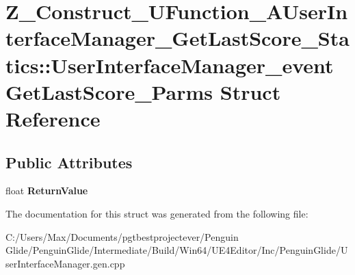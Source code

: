 \hypertarget{struct_z___construct___u_function___a_user_interface_manager___get_last_score___statics_1_1_user926d34881b3e8be3d0bccfb5d9183fea}{}\section{Z\+\_\+\+Construct\+\_\+\+U\+Function\+\_\+\+A\+User\+Interface\+Manager\+\_\+\+Get\+Last\+Score\+\_\+\+Statics\+::User\+Interface\+Manager\+\_\+event\+Get\+Last\+Score\+\_\+\+Parms Struct Reference}
\label{struct_z___construct___u_function___a_user_interface_manager___get_last_score___statics_1_1_user926d34881b3e8be3d0bccfb5d9183fea}
\subsection*{Public Attributes}
\begin{DoxyCompactItemize}
\item 
\mbox{\label{struct_z___construct___u_function___a_user_interface_manager___get_last_score___statics_1_1_user926d34881b3e8be3d0bccfb5d9183fea_adf2ef02417fe85ff79f896d6f949eb93}} 
float {\bfseries Return\+Value}
\end{DoxyCompactItemize}


The documentation for this struct was generated from the following file\+:\begin{DoxyCompactItemize}
\item 
C\+:/\+Users/\+Max/\+Documents/pgtbestprojectever/\+Penguin Glide/\+Penguin\+Glide/\+Intermediate/\+Build/\+Win64/\+U\+E4\+Editor/\+Inc/\+Penguin\+Glide/User\+Interface\+Manager.\+gen.\+cpp\end{DoxyCompactItemize}
